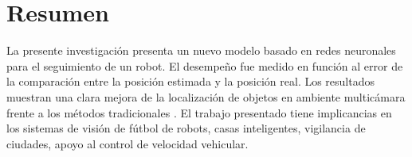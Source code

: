 
\chapter*{Resumen}
La presente investigaci\'on presenta un nuevo modelo basado en redes neuronales  para el seguimiento de un robot. El desempe\~no fue medido en funci\'on al error de la comparaci\'on entre la posici\'on estimada y la posici\'on real. Los resultados muestran una clara mejora de la localizaci\'on de objetos en ambiente multic\'amara frente a los m\'etodos tradicionales . El trabajo presentado tiene implicancias en los sistemas de visi\'on de f\'utbol de robots, casas inteligentes, vigilancia de ciudades, apoyo al control de velocidad vehicular.
